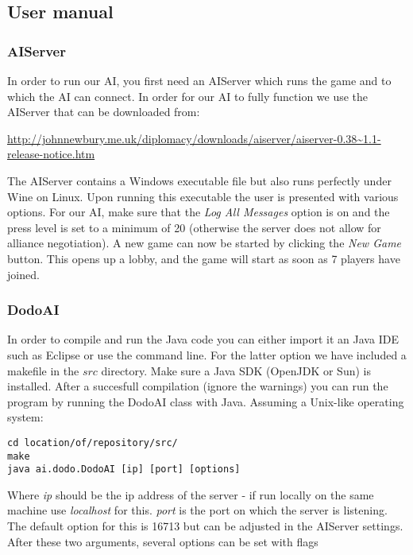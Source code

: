 \documentclass[a4paper]{article} %
\begin{document}
\subsection{User manual}

\subsubsection{AIServer}
In order to run our AI, you first need an AIServer which runs the game and to which the AI can connect. In order for our AI to fully function we use the AIServer that can be downloaded from: 

\begin{sloppypar}
\noindent\url{http://johnnewbury.me.uk/diplomacy/downloads/aiserver/aiserver-0.38~1.1-release-notice.htm}
\end{sloppypar}

The AIServer contains a Windows executable file but also runs perfectly under Wine on Linux. Upon running this executable the user is presented with various options. For our AI, make sure that the \textit{Log All Messages} option is on and the press level is set to a minimum of 20 (otherwise the server does not allow for alliance negotiation). A new game can now be started by clicking the \textit{New Game} button. This opens up a lobby, and the game will start as soon as 7 players have joined.     

\subsubsection{DodoAI}
In order to compile and run the Java code you can either import it an Java IDE such as Eclipse or use the command line. For the latter option we have included a makefile in the $src$ directory. Make sure a Java SDK (OpenJDK or Sun) is installed. After a succesfull compilation (ignore the warnings) you can run the program by running the DodoAI class with Java. Assuming a Unix-like operating system:       
\begin{lstlisting}[frame=single] 
cd location/of/repository/src/
make
java ai.dodo.DodoAI [ip] [port] [options]
\end{lstlisting}

Where \textit{ip} should be the ip address of the server - if run locally on the same machine use \textit{localhost} for this. \textit{port} is the port on which the server is listening. The default option for this is 16713 but can be adjusted in the AIServer settings. After these two arguments, several options can be set with flags
\end{document}
